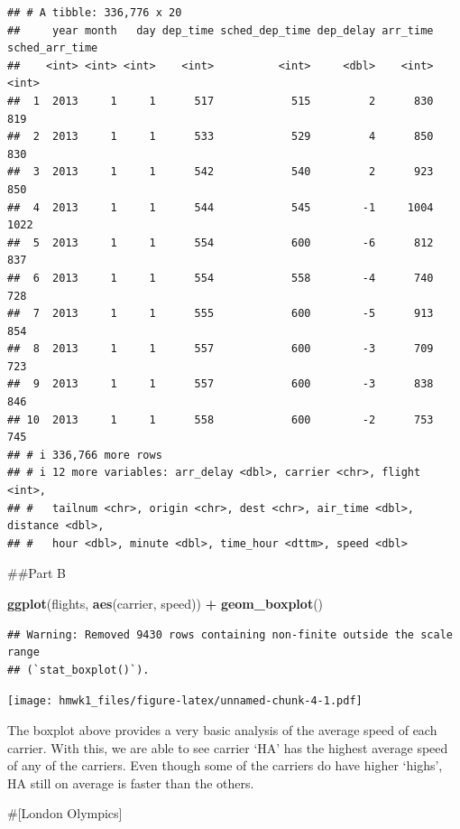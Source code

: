 \documentclass[
]{article}
\newenvironment{Shaded}{\begin{snugshade}}{\end{snugshade}}
\newcommand{\FunctionTok}[1]{\textcolor[rgb]{0.13,0.29,0.53}{\textbf{#1}}}
\newcommand{\NormalTok}[1]{#1}
\newcommand{\SpecialCharTok}[1]{\textcolor[rgb]{0.81,0.36,0.00}{\textbf{#1}}}
\begin{document}
\begin{verbatim}
## # A tibble: 336,776 x 20
##     year month   day dep_time sched_dep_time dep_delay arr_time sched_arr_time
##    <int> <int> <int>    <int>          <int>     <dbl>    <int>          <int>
##  1  2013     1     1      517            515         2      830            819
##  2  2013     1     1      533            529         4      850            830
##  3  2013     1     1      542            540         2      923            850
##  4  2013     1     1      544            545        -1     1004           1022
##  5  2013     1     1      554            600        -6      812            837
##  6  2013     1     1      554            558        -4      740            728
##  7  2013     1     1      555            600        -5      913            854
##  8  2013     1     1      557            600        -3      709            723
##  9  2013     1     1      557            600        -3      838            846
## 10  2013     1     1      558            600        -2      753            745
## # i 336,766 more rows
## # i 12 more variables: arr_delay <dbl>, carrier <chr>, flight <int>,
## #   tailnum <chr>, origin <chr>, dest <chr>, air_time <dbl>, distance <dbl>,
## #   hour <dbl>, minute <dbl>, time_hour <dttm>, speed <dbl>
\end{verbatim}

\#\#Part B

\begin{Shaded}
\begin{Highlighting}[]
\FunctionTok{ggplot}\NormalTok{(flights, }\FunctionTok{aes}\NormalTok{(carrier, speed)) }\SpecialCharTok{+}
  \FunctionTok{geom\_boxplot}\NormalTok{()}
\end{Highlighting}
\end{Shaded}

\begin{verbatim}
## Warning: Removed 9430 rows containing non-finite outside the scale range
## (`stat_boxplot()`).
\end{verbatim}

\texttt{[image: hmwk1\_files/figure-latex/unnamed-chunk-4-1.pdf]}

The boxplot above provides a very basic analysis of the average speed of
each carrier. With this, we are able to see carrier `HA' has the highest
average speed of any of the carriers. Even though some of the carriers
do have higher `highs', HA still on average is faster than the others.

\#{[}London Olympics{]}
\end{document}
